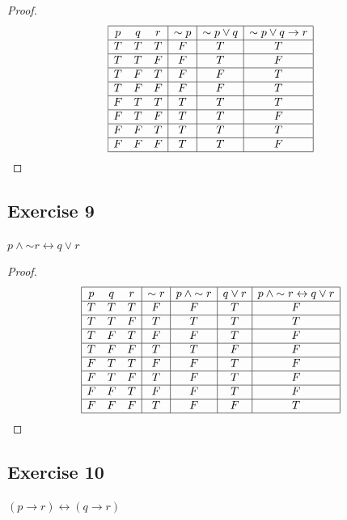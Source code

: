\documentclass[14pt]{extarticle}
\newcommand{\bic}{\leftrightarrow}
\begin{document}
\begin{proof} 
$$ 
\begin{array}{|ccc|c|c|c|} 
\hline 
p & q & r & {\sim p} & {\sim p} \vee q & {\sim p} \vee q \to r\\ 
\hline 
T & T & T & F & T & T \\ 
\hline 
T & T & F & F & T & F \\ 
\hline 
T & F & T & F & F & T \\ 
\hline 
T & F & F & F & F & T \\ 
\hline 
F & T & T & T & T & T \\ 
\hline 
F & T & F & T & T & F \\ 
\hline 
F & F & T & T & T & T \\ 
\hline 
F & F & F & T & T & F \\ 
\hline 
\end{array} 
$$
\end{proof}

\subsection{Exercise 9} 
$p \wedge {\sim r} \bic q \vee r$

\begin{proof} 
$$ 
\begin{array}{|ccc|c|c|c|c|} 
\hline 
p & q & r & {\sim r} & p \wedge {\sim r} & q \vee r & p \wedge {\sim r} \bic q \vee r \\ 
\hline 
T & T & T & F & F & T & F \\ 
\hline 
T & T & F & T & T & T & T \\ 
\hline 
T & F & T & F & F & T & F \\ 
\hline 
T & F & F & T & T & F & F \\ 
\hline 
F & T & T & F & F & T & F \\ 
\hline 
F & T & F & T & F & T & F \\ 
\hline 
F & F & T & F & F & T & F \\
\hline 
F & F & F & T & F & F & T \\ 
\hline 
\end{array} 
$$ 
\end{proof}

\subsection{Exercise 10} 
$(p \to r) \bic (q \to r)$
\end{document}
